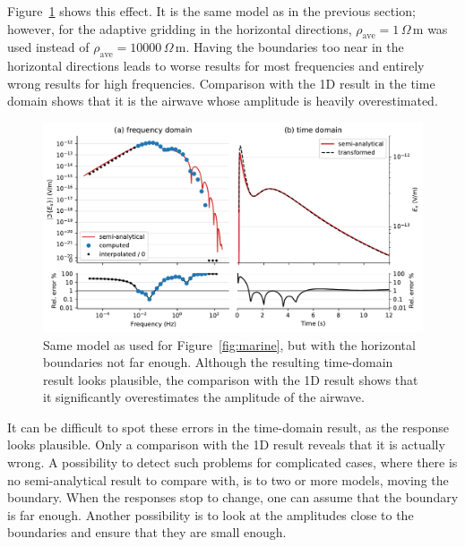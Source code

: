 \documentclass[extra, camera,%
    onecolumn,   %
    referee,     %
]{gji}
\newlength{\fwidth}
\newcommand{\mr}[1]{\mathrm{#1}}
\newcommand{\ohmm}{\ensuremath{\Omega\,}\text{m}\xspace}
\begin{document}
Figure~\ref{fig:marine-wrong-x-y} shows this effect. It is the same model as in
the previous section; however, for the adaptive gridding in the horizontal
directions, $\rho_\mr{ave}=1\,\ohmm$ was used instead of
$\rho_\mr{ave}=\num{10000}\,\ohmm$. Having the boundaries too near in the
horizontal directions leads to worse results for most frequencies and entirely
wrong results for high frequencies. Comparison with the 1D result in the time
domain shows that it is the airwave whose amplitude is heavily overestimated.
%
\begin{figure}
  \centering
  \includegraphics[width=\fwidth]{08-marine-wrong-x-y}
  \caption{Same model as used for Figure~\ref{fig:marine}, but with the
    horizontal boundaries not far enough. Although the resulting time-domain
    result looks plausible, the comparison with the 1D result shows that it
    significantly overestimates the amplitude of the airwave.}
  \label{fig:marine-wrong-x-y}
\end{figure}
%
It can be difficult to spot these errors in the time-domain result, as the
response looks plausible. Only a comparison with the 1D result reveals that it
is actually wrong. A possibility to detect such problems for complicated cases,
where there is no semi-analytical result to compare with, is to  two or more models, moving
the boundary. When the responses stop to change, one can assume that the
boundary is far enough. Another possibility is to look at the amplitudes close
to the boundaries and ensure that they are small enough.


\subsection{} %
\end{document}
